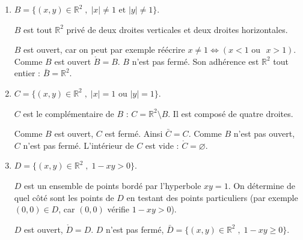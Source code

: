 \documentclass[11pt,a4paper]{article}
\newcommand{\Rr}{\mathbb{R}} \newcommand{\R}{\mathbb{R}}
\renewcommand{\ge}{\geqslant} \renewcommand{\geq}{\geqslant}
\theoremstyle{exostyle}
\begin{document}
\begin{enumerate}
\begin{center}
	\end{center}
	
	\item $B = \{ (x,y) \in \R^2 \; , \;|x| \not = 1 \mbox{ et } |y| \not = 1 \} $.
	
	$B$ est tout $\Rr^2$ privé de deux droites verticales et deux droites horizontales.
	
	$B$ est ouvert, car on peut par exemple réécrire $x\neq1 \iff (x<1 \text{ ou  } x>1)$.
	Comme $B$ est ouvert $\mathring B=B$.
	$B$ n'est pas fermé. Son adhérence est $\Rr^2$ tout entier : $\bar B=\Rr^2$.
	
	\item $C = \{ (x,y) \in \R^2 \; , \; |x|  = 1 \mbox{ ou } |y| = 1 \} $.
	
	$C$ est le complémentaire de $B$ : $C = \Rr^2 \setminus B$. Il est composé de quatre droites.
	
	Comme $B$ est ouvert, $C$ est fermé. Ainsi $\bar C = C$.
	Comme $B$ n'est pas ouvert, $C$ n'est pas fermé.
	L'intérieur de $C$ est vide : $\mathring C = \varnothing$.
		
	\item $D = \{ (x,y) \in \R^2 \; , \; 1 - xy >  0 \} $.
	
	$D$ est un ensemble de points bordé par l'hyperbole $xy=1$. 
	On détermine de quel côté sont les points de $D$ en testant des points particuliers (par exemple $(0,0) \in D$, car $(0,0)$ vérifie $1-xy>0$).
	
	$D$ est ouvert, $\mathring D=D$.
	$D$ n'est pas fermé, $\bar D =  \{ (x,y) \in \R^2 \; , \; 1 - xy \ge  0 \} $.
	
	\begin{center}
		\begin{tikzpicture}[scale=0.5]
			

\end{tikzpicture}
\end{center}
\end{enumerate}
\end{document}
